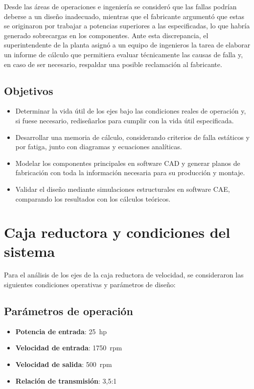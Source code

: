 \documentclass[12pt]{article}
\begin{document}
Desde las áreas de operaciones e ingeniería se consideró que las fallas podrían deberse a un diseño inadecuado, mientras que el fabricante argumentó que estas se originaron por trabajar a potencias superiores a las especificadas, lo que habría generado sobrecargas en los componentes. Ante esta discrepancia, el superintendente de la planta asignó a un equipo de ingenieros la tarea de elaborar un informe de cálculo que permitiera evaluar técnicamente las causas de falla y, en caso de ser necesario, respaldar una posible reclamación al fabricante.

\subsection{Objetivos}
\begin{itemize}
    \item Determinar la vida útil de los ejes bajo las condiciones reales de operación y, si fuese necesario, rediseñarlos para cumplir con la vida útil especificada.
    \item Desarrollar una memoria de cálculo, considerando criterios de falla estáticos y por fatiga, junto con diagramas y ecuaciones analíticas.
    \item Modelar los componentes principales en software CAD y generar planos de fabricación con toda la información necesaria para su producción y montaje.
    \item Validar el diseño mediante simulaciones estructurales en software CAE, comparando los resultados con los cálculos teóricos.

\end{itemize}

\newpage

\section{Caja reductora y condiciones del sistema}

Para el análisis de los ejes de la caja reductora de velocidad, se consideraron las siguientes condiciones operativas y parámetros de diseño:

\subsection{Parámetros de operación}
\begin{itemize}[leftmargin=*,nosep]
    \item \textbf{Potencia de entrada}: \SI{25}{hp}
    \item \textbf{Velocidad de entrada}: \SI{1750}{rpm}
    \item \textbf{Velocidad de salida}: \SI{500}{rpm}
    \item \textbf{Relación de transmisión}: 3{},5:1
\end{itemize}
\end{document}
